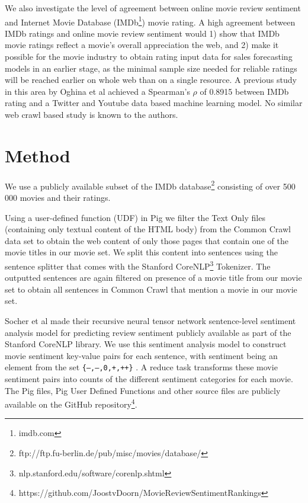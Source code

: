 \documentclass{sig-alternate-br}
\begin{document}
We also investigate the level of agreement between online movie review sentiment and Internet Movie Database (IMDb\footnote{imdb.com}) movie rating. A high agreement between IMDb ratings and online movie review sentiment would 1) show that IMDb movie ratings reflect a movie's overall appreciation the web, and 2) make it possible for the movie industry to obtain rating input data for sales forecasting models in an earlier stage, as the minimal sample size needed for reliable ratings will be reached earlier on whole web than on a single resource. A previous study in this area by Oghina et al \cite{Oghina2012} achieved a Spearman's $\rho$ of 0.8915 between IMDb rating and a Twitter and Youtube data based machine learning model. No similar web crawl based study is known to the authors.

\section{Method}
We use a publicly available subset of the IMDb database\footnote{ftp://ftp.fu-berlin.de/pub/misc/movies/database/} consisting of over 500 000 movies and their ratings.

Using a user-defined function (UDF) in Pig we filter the Text Only files (containing only textual content of the HTML body) from the Common Crawl data set to obtain the web content of only those pages that contain one of the movie titles in our movie set. We split this content into sentences using the sentence splitter that comes with the Stanford CoreNLP\footnote{nlp.stanford.edu/software/corenlp.shtml} Tokenizer. The outputted sentences are again filtered on presence of a movie title from our movie set to obtain all sentences in Common Crawl that mention a movie in our movie set.

Socher et al \cite{Socher2013} made their recursive neural tensor network sentence-level sentiment analysis model for predicting review sentiment publicly available as part of the Stanford CoreNLP library. We use this sentiment analysis model to construct movie sentiment key-value pairs for each sentence, with sentiment being an element from the set \texttt{\{\mbox{---},--,0,+,\mbox{++}\}} . A reduce task transforms these movie sentiment pairs into counts of the different sentiment categories for each movie. The Pig files, Pig User Defined Functions and other source files are publicly available on the GitHub repository\footnote{https://github.com/JoostvDoorn/MovieReviewSentimentRankings}.
\end{document}
